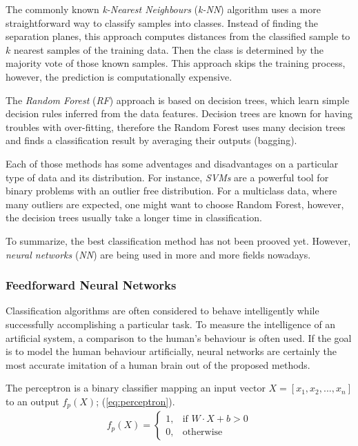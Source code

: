 The commonly known \textit{k-Nearest Neighbours} (\textit{k-NN}) algorithm uses a more straightforward way to classify samples into classes. Instead of finding the separation planes, this approach computes distances from the classified sample to $ k $ nearest samples of the training data. Then the class is determined by the majority vote of those known samples. This approach skips the training process, however, the prediction is computationally expensive.

The \textit{Random Forest} (\textit{RF}) approach \citep{article:rf} is based on decision trees, which learn simple decision rules inferred from the data features. Decision trees are known for having troubles with over-fitting, therefore the Random Forest uses many decision trees and finds a classification result by averaging their outputs (bagging).

Each of those methods has some adventages and disadvantages on a particular type of data and its distribution. For instance, \textit{SVMs} are a powerful tool for binary problems with an outlier free distribution. For a multiclass data, where many outliers are expected, one might want to choose Random Forest, however, the decision trees usually take a longer time in classification.

To summarize, the best classification method has not been prooved yet. However, \textit{neural networks} (\textit{NN}) are being used in more and more fields nowadays.  

\subsubsection*{Feedforward Neural Networks} \label{ssec:intro_to_nn}
Classification algorithms are often considered to behave intelligently while successfully accomplishing a particular task. To measure the intelligence of an artificial system, a comparison to the human's behaviour is often used. If the goal is to model the human behaviour artificially, neural networks are certainly the most accurate imitation of a human brain out of the proposed methods.

The perceptron \citep{article:perceptron} is a binary classifier mapping an input vector $ X = [x_1, x_2, ..., x_n] $ to an output $ f_p(X) $; (\cref{eq:perceptron}).
\noindent
\begin{align} \label{eq:perceptron}
f_p(X) = 
\begin{cases}
    1, & \text{if }  W \cdot X + b > 0\\
    0,              & \text{otherwise}
\end{cases}
\end{align}

